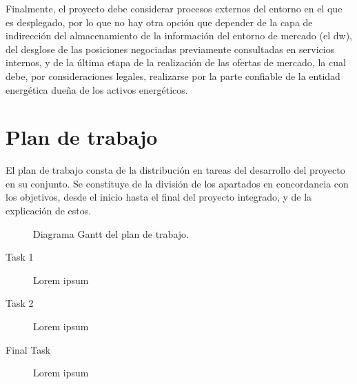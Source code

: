 Finalmente, el proyecto debe considerar procesos externos del entorno en el que es desplegado, por lo que no hay otra opción que depender de la capa de indirección del almacenamiento de la información del entorno de mercado (el \gls{dw}), del desglose de las posiciones negociadas previamente consultadas en servicios internos, y de la última etapa de la realización de las ofertas de mercado, la cual debe, por consideraciones legales, realizarse por la parte confiable de la entidad energética dueña de los activos energéticos.

\section{Plan de trabajo}
\label{makereference1.3}

El plan de trabajo consta de la distribución en tareas del desarrollo del proyecto en su conjunto. Se constituye de la división de los apartados en concordancia con los objetivos, desde el inicio hasta el final del proyecto integrado, y de la explicación de estos.

\begin{figure}[h]
  \centering
  \caption{Diagrama Gantt del plan de trabajo.}
  \label{fig:plan-trabajo}
\end{figure}

\begin{description}

  \item[Task 1] Lorem ipsum

  \item[Task 2] Lorem ipsum

  \item[Final Task] Lorem ipsum

\end{description}
